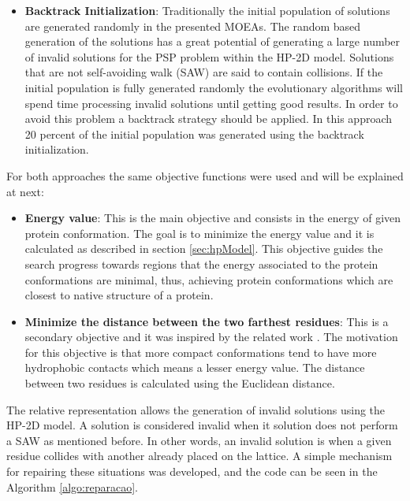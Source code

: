 \begin{itemize}
\begin{itemize}
	\end{itemize}

	
	\item \textbf{Backtrack Initialization}: Traditionally the initial population of solutions are generated randomly in the presented MOEAs. The random based generation of the solutions has a great potential of generating a large number of invalid solutions for the PSP problem within the HP-2D model. Solutions that are not self-avoiding walk (SAW) are said to contain collisions. If the initial population is fully generated randomly the evolutionary algorithms will spend time processing invalid solutions until getting good results. In order to avoid this problem a backtrack strategy should be applied. In this approach 20 percent of the initial population was generated using the backtrack initialization.
	
\end{itemize}


For both approaches the same objective functions were used and will be explained  at next:


\begin{itemize}
	\item \textbf{Energy value}: This is the main objective and consists in the energy of given protein conformation.  The goal is to minimize the energy value and it is calculated as described in section \ref{sec:hpModel}. This objective guides the search progress towards regions that the energy associated to the protein conformations are minimal, thus, achieving protein conformations which are closest to native structure of a protein.
	\item \textbf{Minimize the distance between the two farthest residues}: This is a secondary objective and it was inspired by the related work \cite{gabriel2012algoritmos}. The motivation for this objective is that more compact conformations tend to have more hydrophobic contacts which means a lesser energy value. The distance between two residues is calculated using the Euclidean distance.
\end{itemize}


The relative representation allows the generation of invalid solutions using the HP-2D model. A solution is considered invalid when it solution does not perform a SAW as mentioned before. In other words, an invalid solution is when a given residue collides with another already placed on the lattice. A simple mechanism for repairing these situations was developed, and the code can be seen in the Algorithm \ref{algo:reparacao}.


